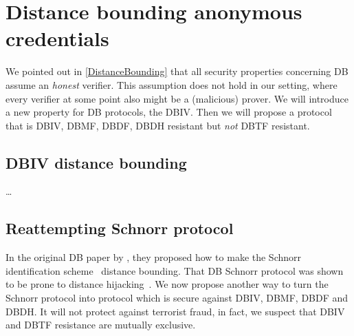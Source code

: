 \section{Distance bounding anonymous credentials}%
\label{DB-anon-cred}


We pointed out in \cref{DistanceBounding} that all security properties 
concerning \ac{DB} assume an \emph{honest} verifier.
This assumption does not hold in our setting, where every verifier at some point 
also might be a (malicious) prover.
We will introduce a new property for \ac{DB} protocols, the \ac{DBIV}.
Then we will propose a protocol that is \ac{DBIV}, \ac{DBMF}, \ac{DBDF}, 
\ac{DBDH} resistant but \emph{not} \ac{DBTF} resistant.

\subsection{\Acl{DBIV} distance bounding}

\dots

\subsection{Reattempting  Schnorr protocol}

In the original \ac{DB} paper by \citet{DistanceBounding}, they proposed how to 
make the Schnorr identification scheme~\cite{Schnorr} distance bounding.
That \ac{DB} Schnorr protocol was shown to be prone to distance 
hijacking~\cite{DistanceHijacking}.
We now propose another way to turn the Schnorr protocol into  protocol 
which is secure against \ac{DBIV}, \ac{DBMF}, \ac{DBDF} and \ac{DBDH}.
It will not protect against terrorist fraud, in fact, we suspect that \ac{DBIV} 
and \ac{DBTF} resistance are mutually exclusive.
